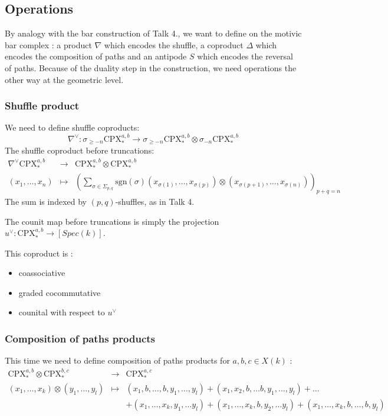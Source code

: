 \subsection{Operations}
By analogy with the bar construction of Talk 4., we want to define on the motivic bar complex : a product $\nabla$ which encodes the shuffle, a coproduct $\Delta$ which encodes the composition of paths and an antipode $S$ which encodes the reversal of paths. Because of the duality step in the construction, we need operations the other way at the geometric level.
\subsubsection{Shuffle product}
We need to define shuffle coproducts:
\[
\nabla^\vee:\sigma_{\geq -n} \mathrm{CPX}_*^{a,b} \to \sigma_{\geq -n} \mathrm{CPX}_*^{a,b} \otimes \sigma_{-n} \mathrm{CPX}_*^{a,b}
\]
The shuffle coproduct before truncations:
\[
\begin{array}{rcl}
\nabla^\vee\mathrm{CPX}_*^{a,b} & \to & \mathrm{CPX}_*^{a,b} \otimes \mathrm{CPX}_*^{a,b} \\
(x_1, \ldots, x_n) & \mapsto & (\sum_{\sigma \in \Sigma_{p,q}} \mathrm{sgn}(\sigma)(x_{\sigma(1)}, \ldots, x_{\sigma(p)}) \otimes (x_{\sigma(p+1)}, \ldots, x_{\sigma(n)}))_{p+q=n}
\end{array}
\]
The sum is indexed by $(p,q)$-shuffles, as in Talk 4.

The counit map before truncations is simply the projection $u^\vee:\mathrm{CPX}_*^{a,b}\rightarrow [Spec(k)]$.

\begin{lemma}
This coproduct is :
\begin{itemize}
\item coassociative
\item graded cocommutative
\item counital with respect to $u^{\vee}$
\end{itemize}
\end{lemma}

\subsubsection{Composition of paths products}
This time we need to define composition of paths products for $a,b,c\in X(k)$ :
\[
\begin{array}{rcl}
\mathrm{CPX}_*^{a,b} \otimes \mathrm{CPX}_*^{b,c} & \to & \mathrm{CPX}_*^{a,c} \\
(x_1, \ldots, x_k) \otimes (y_1, \ldots, y_l) & \mapsto & (x_1,b,\ldots,b,y_1,\ldots,y_l)+(x_1,x_2,b,\ldots b,y_1,\ldots,y_l)+\ldots\\
& & +(x_1,\ldots,x_k,y_1,\ldots y_l)+(x_1,\ldots,x_k,b,y_2,\ldots y_l)+(x_1,\ldots,x_k,b,\ldots,b,y_l)
\end{array}
\]


